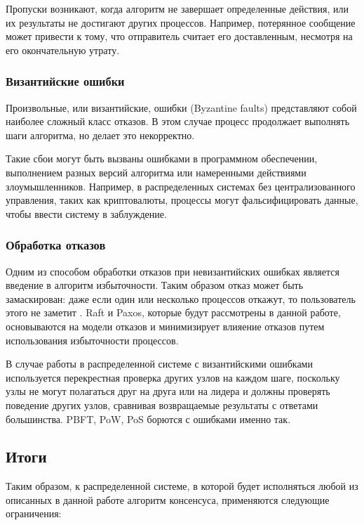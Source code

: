 Пропуски возникают, когда алгоритм не завершает определенные действия, или их
результаты не достигают других процессов. Например, потерянное сообщение может
привести к тому, что отправитель считает его доставленным, несмотря на его
окончательную утрату.

\subsubsection*{Византийские ошибки}

Произвольные, или византийские, ошибки (Byzantine faults) представляют собой
наиболее сложный класс отказов. В этом случае процесс продолжает выполнять шаги
алгоритма, но делает это некорректно.

Такие сбои могут быть вызваны ошибками в программном обеспечении, выполнением
разных версий алгоритма или намеренными действиями злоумышленников. Например,
в распределенных системах без централизованного управления, таких как
криптовалюты, процессы могут фальсифицировать данные, чтобы ввести систему в
заблуждение.

\subsubsection*{Обработка отказов}

Одним из способом обработки отказов при невизантийских ошибках является введение
в алгоритм избыточности. Таким образом отказ может быть замаскирован: даже если
один или несколько процессов откажут, то пользователь этого не заметит
\cite{christian91}. Raft и Paxos, которые будут рассмотрены в данной работе,
основываются на модели отказов и минимизирует влияение отказов путем
использования избыточности процессов.

В случае работы в распределенной системе с византийскими ошибками используется
перекрестная проверка других узлов на каждом шаге, поскольку узлы не могут
полагаться друг на друга или на лидера и должны проверять поведение других узлов,
сравнивая возвращаемые результаты с ответами большинства. PBFT, PoW, PoS борются
с ошибками именно так.

\subsection{Итоги}

Таким образом, к распределенной системе, в которой будет исполняться любой из
описанных в данной работе алгоритм консенсуса, применяются следующие ограничения:


